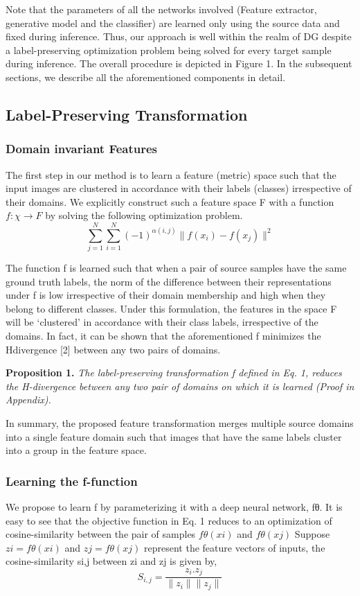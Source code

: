 \documentclass[review]{cvpr}
\begin{document}
Note that the parameters of all the networks involved
(Feature extractor, generative model and the classifier) are
learned only using the source data and fixed during inference. Thus, our approach is well within the realm of DG despite a label-preserving optimization problem being solved
for every target sample during inference. The overall procedure is depicted in Figure 1. In the subsequent sections,
we describe all the aforementioned components in detail.

\subsection{Label-Preserving Transformation}
\subsubsection{Domain invariant Features}
The first step in our method is to learn a feature (metric)
space such that the input images are clustered in accordance
with their labels (classes) irrespective of their domains. We
explicitly construct such a feature space F with a function
$ f: \chi \longrightarrow F $ by solving the following optimization problem.
\begin{equation}
 \sum_{j=1}^{N} \sum_{i=1}^{N}   (-1)^{\alpha(i,j)} \|f(x_i) - f(x_j)\|^2
\end{equation}



The function f is learned such that when a pair of source
samples have the same ground truth labels, the norm of the
difference between their representations under f is low irrespective of their domain membership and high when they
belong to different classes. Under this formulation, the features in the space F will be ‘clustered’ in accordance with
their class labels, irrespective of the domains. In fact, it
can be shown that the aforementioned f minimizes the Hdivergence [2] between any two pairs of domains.

\textbf{Proposition 1.} \textit{The label-preserving transformation f defined in Eq. 1, reduces the H-divergence between any two
pair of domains on which it is learned (Proof in Appendix).}

In summary, the proposed feature transformation merges
multiple source domains into a single feature domain such
that images that have the same labels cluster into a group in
the feature space.

\subsubsection{Learning the f-function}
We propose to learn f by parameterizing it with a deep neural network, fθ. It is easy to see that the objective function in Eq. 1 reduces to an optimization of cosine-similarity
between the pair of samples $fθ(xi)$ and $fθ(xj)$ Suppose
$zi = fθ(xi)$ and $zj = fθ(xj)$ represent the feature vectors of inputs, the cosine-similarity si,j between zi and zj
is given by,
\begin{equation}
    S_{i,j} = \frac{z_i . z_j}{\|z_i\|  \|z_j\| }
\end{equation}
\end{document}

